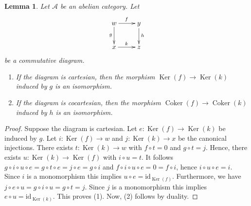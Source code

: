 \documentclass[10pt,a4paper]{amsart}
\theoremstyle{plain}
\newtheorem{lemma}[subsection]{Lemma}
\theoremstyle{definition}
\theoremstyle{remark}
\numberwithin{equation}{subsection}
\def\Ker{\mathop{\mathrm{Ker}}}
\def\Coker{\mathop{\mathrm{Coker}}}
\begin{document}
\begin{lemma}
\label{lemma-cartesian-kernel}
Let $\mathcal{A}$ be an abelian category. Let
$$
\xymatrix{
w\ar[r]^f\ar[d]_g
& y\ar[d]^h\\
x\ar[r]^k
& z
}
$$
be a commutative diagram.
\begin{enumerate}
\item If the diagram is cartesian, then the morphism 
$\Ker(f)\to\Ker(k)$ induced by $g$ is an isomorphism.
\item If the diagram is cocartesian, then the morphism 
$\Coker(f)\to\Coker(k)$ induced by $h$ is an isomorphism.
\end{enumerate}
\end{lemma}

\begin{proof}
Suppose the diagram is cartesian. Let 
$e:\Ker(f)\to\Ker(k)$ be induced by $g$. Let 
$i:\Ker(f)\to w$ and $j:\Ker(k)\to x$ be the canonical 
injections. There exists $t:\Ker(k)\to w$ with $f\circ t=0$ 
and $g\circ t=j$. Hence, there exists $u:\Ker(k)\to\Ker(f)$ 
with $i\circ u=t$. It follows 
$g\circ i\circ u\circ e=g\circ t\circ e=j\circ e=g\circ i$ and 
$f\circ i\circ u\circ e=0=f\circ i$, hence $i\circ u\circ e=i$. Since 
$i$ is a monomorphism this implies $u\circ e=\text{id}_{\Ker(f)}$.
Furthermore, we have $j\circ e\circ u=g\circ i\circ u=g\circ t=j$. 
Since $j$ is a monomorphism this implies $e\circ u=\text{id}_{\Ker(k)}$.
This proves (1). Now, (2) follows by duality.
\end{proof}
\end{document}
